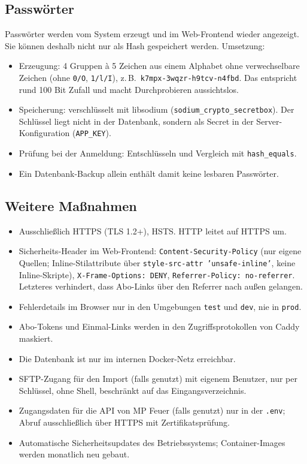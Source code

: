 \documentclass[a4paper,fontsize=10pt]{scrartcl}
\newcommand{\code}[1]{\texttt{#1}}
\begin{document}
\subsection*{Passwörter}

Passwörter werden vom System erzeugt und im Web-Frontend wieder angezeigt.
Sie können deshalb nicht nur als Hash gespeichert werden. Umsetzung:

\begin{itemize}
  \item Erzeugung: 4 Gruppen à 5 Zeichen aus einem Alphabet ohne
        verwechselbare Zeichen (ohne \code{0/O}, \code{1/l/I}), z.\,B.\
        \code{k7mpx-3wqzr-h9tcv-n4fbd}. Das entspricht rund 100 Bit Zufall
        und macht Durchprobieren aussichtslos.
  \item Speicherung: verschlüsselt mit libsodium
        (\code{sodium\_crypto\_secretbox}). Der Schlüssel liegt nicht in der
        Datenbank, sondern als Secret in der Server-Konfiguration
        (\code{APP\_KEY}).
  \item Prüfung bei der Anmeldung: Entschlüsseln und Vergleich mit
        \code{hash\_equals}.
  \item Ein Datenbank-Backup allein enthält damit keine lesbaren Passwörter.
\end{itemize}

\subsection*{Weitere Maßnahmen}

\begin{itemize}
  \item Ausschließlich HTTPS (TLS 1.2+), HSTS. HTTP leitet auf HTTPS um.
  \item Sicherheits-Header im Web-Frontend: \code{Content-Security-Policy}
        (nur eigene Quellen; Inline-Stilattribute über
        \code{style-src-attr 'unsafe-inline'}, keine Inline-Skripte),
        \code{X-Frame-Options: DENY},
        \code{Referrer-Policy: no-referrer}. Letzteres verhindert, dass
        Abo-Links über den Referrer nach außen gelangen.
  \item Fehlerdetails im Browser nur in den Umgebungen \code{test} und
        \code{dev}, nie in \code{prod}.
  \item Abo-Tokens und Einmal-Links werden in den Zugriffsprotokollen von
        Caddy maskiert.
  \item Die Datenbank ist nur im internen Docker-Netz erreichbar.
  \item SFTP-Zugang für den Import (falls genutzt) mit eigenem Benutzer, nur
        per Schlüssel, ohne Shell, beschränkt auf das Eingangsverzeichnis.
  \item Zugangsdaten für die API von MP Feuer (falls genutzt) nur in der
        \code{.env}; Abruf ausschließlich über HTTPS mit Zertifikatsprüfung.
  \item Automatische Sicherheitsupdates des Betriebssystems;
        Container-Images werden monatlich neu gebaut.
\end{itemize}
\end{document}
